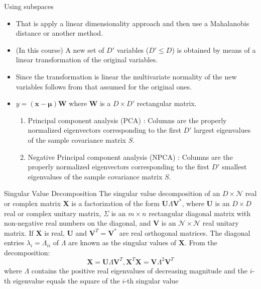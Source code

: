 \documentclass[10pt]{beamer}
\def\x{{\mathbf {x}}}
\def\dimension{D}
\newcommand{\vectorI}{\x}
\newcommand{\mmu}{\boldsymbol{\mu}}
\begin{document}
 
 \begin{frame}{Using  subspaces}
 \begin{itemize}
\item  That is apply a linear dimensionality approach and then use a Mahalanobis distance or another method. 
\item (\alert{In this course}) A new set of $\dimension'$ variables ($\dimension'\leq \dimension$) is obtained by means of a linear transformation of the original variables. 
\item Since the transformation is linear  the multivariate normality of the new variables follows from that assumed for the original ones.
\item $y=(\vectorI-\mmu)\mathbf{W}$  where $\mathbf{W}$ is a $\dimension\times \dimension'$ rectangular matrix.
\begin{enumerate}
\item  Principal component analysis (PCA) : Columns are the properly normalized eigenvectors corresponding to the first $\dimension'$ largest eigenvalues of the
 sample covariance matrix $S$.
 \item  Negative Principal component analysis (NPCA) : Columns are the properly normalized eigenvectors corresponding to the first $\dimension'$ smallest eigenvalues of the
 sample covariance matrix $S$.
 \end{enumerate}
 \end{itemize}
 \end{frame}
 
\begin{frame}{Singular Value Decomposition}
The singular value decomposition of an $\dimension \times \mathcal{N} $ real or complex matrix $\mathbf {X}$ is a factorization of the form $\mathbf {U}\Lambda \mathbf{V}^{*}$, where $\mathbf {U}$ is an $\dimension\times \dimension$ real or complex unitary matrix, $\Sigma$ is an $m\times n$ rectangular diagonal matrix with non-negative real numbers on the diagonal, and $ \mathbf {V}$  is an  $\mathcal{N} \times \mathcal{N} $ real unitary matrix. If  $\mathbf {X}$ is real, $ \mathbf {U}$ and $ \mathbf {V}^{T} =\mathbf{V^{*}}$ are real orthogonal matrices. The diagonal entries $ \lambda_{i}=\Lambda_{ii}$ of  $\Lambda$ are known as the singular values of $\mathbf {X}$.
From the decomposition:
\begin{equation}
\mathbf{X}=\mathbf {U}\Lambda \mathbf{V}^{T} ,
\mathbf{X}^T\mathbf{X}=\mathbf{V} \Lambda^2 \mathbf{V}^T
\end{equation}
where $\Lambda$ contains the positive real eigenvalues of decreasing magnitude and the $i$-th eigenvalue equals the square of the $i$-th singular value
\end{frame} 
\end{document}
